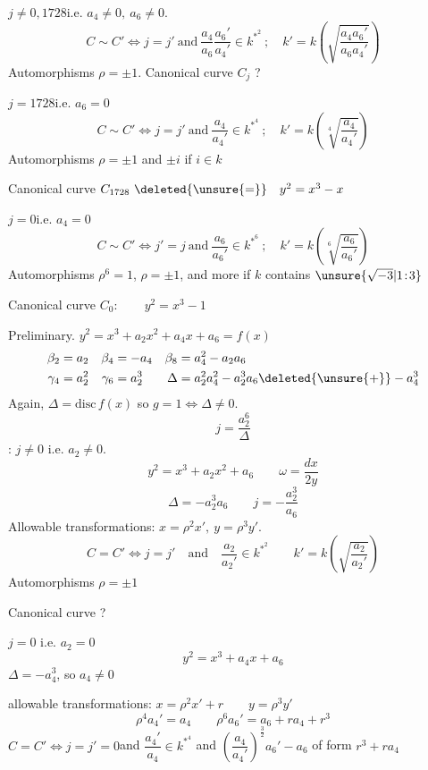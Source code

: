  \quad $j\ne0,1728$\qquad i.e. $a_4\ne0,\ a_6\ne0$.
\[
C\sim C'\Longleftrightarrow j=j'\ \text{and}\ 
\frac{a_4}{a_6}\frac{a_6'}{a_4'}\in k^{*^{2}}\ ;\quad
k'=k\left(\sqrt{\frac{a_4a_6'}{a_6a_4'}}\right)
\]
Automorphisms \quad $\rho=\pm1$. \qquad Canonical curve $C_j$ ?

 \quad $j=1728$\qquad i.e. $a_6=0$
\[
C\sim C'\Longleftrightarrow j=j'\ \text{and}\ 
\frac{a_4}{a_4'}\in k^{*^{4}}\ ;\quad
k'=k\left(\sqrt[4]{\frac{a_4}{a_4'}}\right)
\]
Automorphisms \quad $\rho=\pm1$ and $\pm i$ if $i\in k$

Canonical curve $C_{1728}\ \deleted{\unsure{=}}\quad y^2=x^3-x$

\uuline{Case 3} \quad $j=0$\qquad i.e. $a_4=0$
\[
C\sim C'\Longleftrightarrow j'=j\ \text{and}\ 
\frac{a_6}{a_6'}\in k^{*^{6}}\ ;\quad
k'=k\left(\sqrt[6]{\frac{a_6}{a_6'}}\right)
\]
Automorphisms \quad $\rho^6=1$, \quad $\rho=\pm1$, \quad and more if $k$ contains $\unsure{\sqrt{-3}|1\!:\!3}$

Canonical curve $C_0:\qquad y^2=x^3-1$

\scanpage{38}
\qquad Preliminary. \quad $y^2=x^3+a_2x^2+a_4x+a_6=f(x)$
\[
\begin{aligned}
\beta_2&=a_2 &\beta_4&=-a_4 &\beta_8&=a_4^2-a_2a_6\\
\gamma_4&=a_2^2 &\gamma_6&=a_2^3 &\Delta&=a_2^2a_4^2-a_2^3a_6\deleted{\unsure{+}}-a_4^3
\end{aligned}
\]
Again, $\Delta=\mathrm{disc}\,f(x)$ so $g=1\Longleftrightarrow\Delta\ne0$.
\[
j=\frac{a_2^6}{\Delta}
\]
: \quad $j\ne0$ i.e. $a_2\ne0$.
\[
\boxed{y^2=x^3+a_2x^2+a_6}\qquad \omega=\frac{dx}{2y}
\]
\[
\Delta=-a_2^3a_6\qquad j=-\frac{a_2^3}{a_6}
\]
Allowable transformations: \quad $x=\rho^2x',\ y=\rho^3y'$.
\[
C=C'\Longleftrightarrow j=j'\quad\text{and}\quad
\frac{a_2}{a_2'}\in k^{*^{2}}\qquad k'=k\left(\sqrt{\frac{a_2}{a_2'}}\right)
\]
Automorphisms \qquad $\rho=\pm1$

Canonical curve ?

 \quad $j=0$ i.e. $a_2=0$
\[
\boxed{y^2=x^3+a_4x+a_6}
\]
$\Delta=-a_4^3$, so $a_4\ne0$

allowable transformations: \qquad $x=\rho^2x'+r\qquad y=\rho^3y'$
\[
\rho^4a_4'=a_4\qquad \rho^6a_6'=a_6+ra_4+r^3
\]
$C=C'\Longleftrightarrow j=j'=0$\quad and \quad $\dfrac{a_4'}{a_4}\in k^{*^{4}}$ \quad and $\left(\dfrac{a_4}{a_4'}\right)^{\frac32}a_6'-a_6$ of form $r^3+ra_4$


